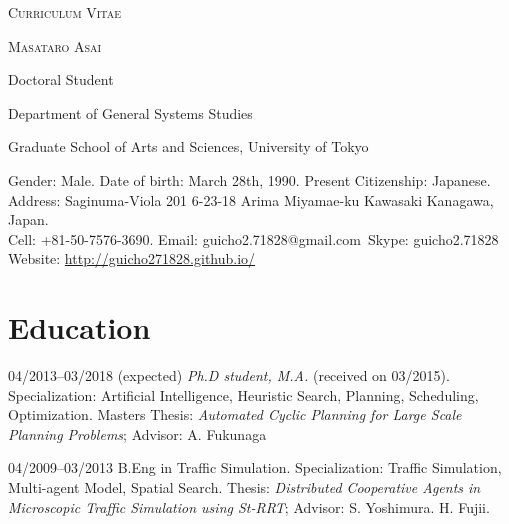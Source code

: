 \documentclass[letterpaper,12pt]{article}
\begin{document}
\pagestyle{empty}

\begin{center}
\huge{\textsc{Curriculum Vitae}}
\vspace{0.7\baselineskip}

\Large{\textsc{Masataro Asai}}
\vspace{0.5\baselineskip}

\large{
Doctoral Student

Department of General Systems Studies

Graduate School of Arts and Sciences, University of Tokyo
}

\vspace{0.8\baselineskip}

\normalsize{
 Gender: Male. Date of birth: March 28th, 1990. Present Citizenship: Japanese. \\
 Address: Saginuma-Viola 201 6-23-18 Arima Miyamae-ku Kawasaki Kanagawa, Japan. \\
 Cell: +81-50-7576-3690. Email: guicho2.71828@gmail.com\ Skype: guicho2.71828\\
 Website: \url{http://guicho271828.github.io/}}
\end{center}


\section{Education}

\begin{CV}
 \item[04/2013--03/2018] (expected) \textit{Ph.D student, M.A.} (received on 03/2015).
 Specialization: Artificial Intelligence, Heuristic Search, Planning, Scheduling, Optimization.
 {\small Masters Thesis: \emph{Automated Cyclic Planning for Large Scale Planning Problems}; Advisor: A. Fukunaga}

 \item[04/2009--03/2013] B.Eng in Traffic Simulation.
 Specialization: Traffic Simulation, Multi-agent Model, Spatial Search.
 {\small Thesis: \emph{Distributed Cooperative Agents in Microscopic
 Traffic Simulation using St-RRT}; Advisor: S. Yoshimura. H. Fujii.}
\end{CV}

\renewcommand{\refname}{Publications}

\let\uline\relax
\nocite{Asai2016}
\nocite{Asai2015}
\nocite{Asai2014}
\nocite{Asai2014b}
\end{document}
